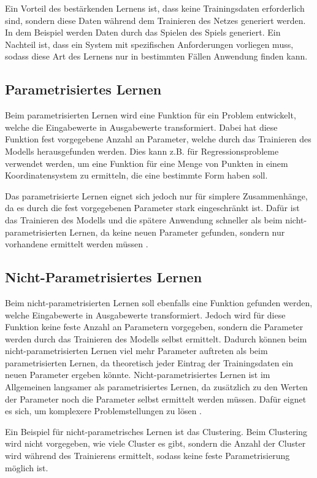 Ein Vorteil des bestärkenden Lernens ist, dass keine Trainingsdaten erforderlich sind, sondern diese Daten während dem Trainieren des Netzes generiert werden. In dem Beispiel werden Daten durch das Spielen des Spiels generiert. Ein Nachteil ist, dass ein System mit spezifischen Anforderungen vorliegen muss, sodass diese Art des Lernens nur in bestimmten Fällen Anwendung finden kann.

\subsection{Parametrisiertes Lernen}
\label{parametrisiertesLernen}
Beim parametrisierten Lernen wird eine Funktion für ein Problem entwickelt, welche die Eingabewerte in Ausgabewerte transformiert. Dabei hat diese Funktion fest vorgegebene Anzahl an Parameter, welche durch das Trainieren des Modells herausgefunden werden. Dies kann z.B. für Regressionsprobleme verwendet werden, um eine Funktion für eine Menge von Punkten in einem Koordinatensystem zu ermitteln, die eine bestimmte Form haben soll.

Das parametrisierte Lernen eignet sich jedoch nur für simplere Zusammenhänge, da es durch die fest vorgegebenen Parameter stark eingeschränkt ist. Dafür ist das Trainieren des Modells und die spätere Anwendung schneller als beim nicht-parametrisierten Lernen, da keine neuen Parameter gefunden, sondern nur vorhandene ermittelt werden müssen \cite[vgl.][]{paraNichtPara}.

\subsection{Nicht-Parametrisiertes Lernen}
\label{nichtParametrisiertesLernen}
Beim nicht-parametrisierten Lernen soll ebenfalls eine Funktion gefunden werden, welche Eingabewerte in Ausgabewerte transformiert. Jedoch wird für diese Funktion keine feste Anzahl an Parametern vorgegeben, sondern die Parameter werden durch das Trainieren des Modells selbst ermittelt. Dadurch können beim nicht-parametrisierten Lernen viel mehr Parameter auftreten als beim parametrisierten Lernen, da theoretisch jeder Eintrag der Trainingsdaten ein neuen Parameter ergeben könnte. Nicht-parametrisiertes Lernen ist im Allgemeinen langsamer als parametrisiertes Lernen, da zusätzlich zu den Werten der Parameter noch die Parameter selbst ermittelt werden müssen. Dafür eignet es sich, um komplexere Problemstellungen zu lösen \cite[vgl.][]{paraNichtPara}.

Ein Beispiel für nicht-parametrisches Lernen ist das Clustering. Beim Clustering wird nicht vorgegeben, wie viele Cluster es gibt, sondern die Anzahl der Cluster wird während des Trainierens ermittelt, sodass keine feste Parametrisierung möglich ist.


